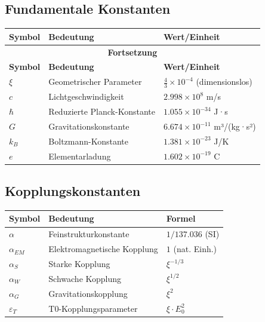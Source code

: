\documentclass[12pt,a4paper]{article}
\begin{document}
\subsection{Fundamentale Konstanten}
\begin{longtable}{lll}
	\toprule
	\textbf{Symbol} & \textbf{Bedeutung} & \textbf{Wert/Einheit} \\
	\midrule
	\endfirsthead
	\multicolumn{3}{c}{{\bfseries Fortsetzung}} \\
	\toprule
	\textbf{Symbol} & \textbf{Bedeutung} & \textbf{Wert/Einheit} \\
	\midrule
	\endhead
	\bottomrule
	\endfoot
	\bottomrule
	\endlastfoot
	
	$\xi$ & Geometrischer Parameter & $\frac{4}{3} \times 10^{-4}$ (dimensionslos) \\
	$c$ & Lichtgeschwindigkeit & $2.998 \times 10^8$ m/s \\
	$\hbar$ & Reduzierte Planck-Konstante & $1.055 \times 10^{-34}$ J·s \\
	$G$ & Gravitationskonstante & $6.674 \times 10^{-11}$ m³/(kg·s²) \\
	$k_B$ & Boltzmann-Konstante & $1.381 \times 10^{-23}$ J/K \\
	$e$ & Elementarladung & $1.602 \times 10^{-19}$ C \\
\end{longtable}

\subsection{Kopplungskonstanten}
\begin{longtable}{lll}
	\toprule
	\textbf{Symbol} & \textbf{Bedeutung} & \textbf{Formel} \\
	\midrule
	$\alpha$ & Feinstrukturkonstante & $1/137.036$ (SI) \\
	$\alpha_{EM}$ & Elektromagnetische Kopplung & $1$ (nat. Einh.) \\
	$\alpha_S$ & Starke Kopplung & $\xi^{-1/3}$ \\
	$\alpha_W$ & Schwache Kopplung & $\xi^{1/2}$ \\
	$\alpha_G$ & Gravitationskopplung & $\xi^{2}$ \\
	$\varepsilon_T$ & T0-Kopplungsparameter & $\xi \cdot E_0^2$ \\
	\bottomrule
\end{longtable}
\end{document}
